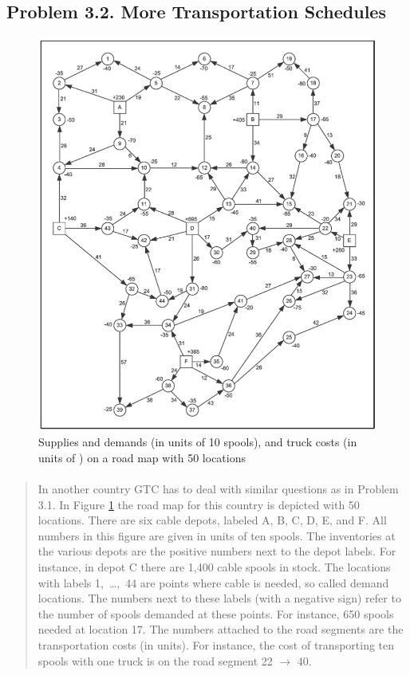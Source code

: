 \subsection{Problem 3.2. More Transportation Schedules}

\begin{figure}[H]
	\centering
	\includegraphics[scale=1]{./img/figure3-14.png}
	\caption{Supplies and demands (in units of 10 spools), and truck costs (in units of ) on a road map with 50 locations}
	\label{network3-2}
\end{figure}

\paragraph{}
\begin{quote}
In another country GTC has to deal with similar questions as in Problem 3.1. In Figure \ref{network3-2} the road map for this country is depicted with 50 locations. There are six cable depots, labeled A, B, C, D, E, and F. All numbers in this figure are given in units of ten spools. The inventories at the various depots are the positive numbers next to the depot labels. For instance, in depot C there are 1,400 cable spools in stock. The locations with labels 1,~\dots,~44 are points where cable is needed, so called demand locations. The numbers next to these labels (with a negative sign) refer to the number of spools demanded at these points. For instance, 650 spools needed at location 17. The numbers attached to the road segments are the transportation costs (in  units). For instance, the cost of transporting ten spools with one truck is  on the road segment 22 $\rightarrow$ 40.
\end{quote}

